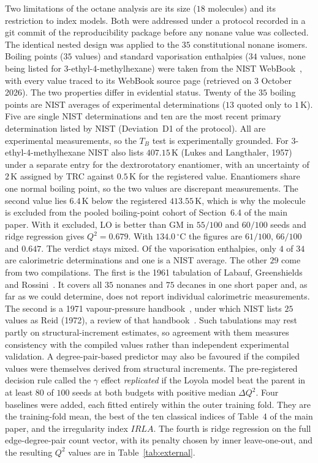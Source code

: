 \documentclass[a5paper, 10pt]{article}
\theoremstyle{plain}
\theoremstyle{remark}
\theoremstyle{definition}
\begin{document}
Two limitations of the octane analysis are its size ($18$ molecules) and
its restriction to index models. Both were addressed under a protocol
recorded in a git commit of the reproducibility package before any
nonane value was collected. The identical nested design was applied to
the $35$ constitutional nonane isomers. Boiling points ($35$ values) and
standard vaporisation enthalpies ($34$ values, none being listed for
3-ethyl-4-methylhexane) were taken from the NIST
WebBook~\cite{NISTWebBook}, with every value traced to its WebBook
source page (retrieved on 3 October 2026). The two properties differ in evidential status. Twenty of
the $35$ boiling points are NIST averages of experimental
determinations ($13$ quoted only to $1$\,K). Five are single NIST
determinations and ten are the most recent primary determination listed
by NIST (Deviation~D1 of the protocol). All are experimental
measurements, so the $T_B$ test is experimentally grounded. For
3-ethyl-4-methylhexane NIST also lists $407.15$\,K (Lukes and Langthaler, 1957) under a separate entry for the dextrorotatory enantiomer, with an uncertainty of $2$\,K assigned by TRC against $0.5$\,K for the registered value. Enantiomers share one normal boiling point, so the two values are discrepant measurements. The second value lies $6.4$\,K below the
registered $413.55$\,K, which is why the molecule is excluded from the
pooled boiling-point cohort of Section~6.4 of the main paper. With it
excluded, LO is better than GM in $55/100$ and $60/100$ seeds and ridge
regression gives $Q^2 = 0.679$. With $134.0\,^{\circ}$C the figures are
$61/100$, $66/100$ and $0.647$. The verdict stays mixed.
Of the vaporisation enthalpies, only $4$ of $34$ are calorimetric
determinations and one is a NIST average. The other $29$ come from two
compilations. The first is the 1961 tabulation of
Labauf, Greenshields and Rossini~\cite{LabaufGreenshieldsRossini1961}.
It covers all $35$ nonanes and $75$ decanes in one short paper and, as far as we could determine, does not report individual calorimetric measurements. The second is a 1971 vapour-pressure handbook~\cite{WilhoitZwolinski1971}, under which NIST lists $25$ values as Reid (1972), a review of that handbook~\cite{Reid1972}. Such tabulations may rest
partly on structural-increment estimates, so agreement with them
measures consistency with the compiled values rather than independent
experimental validation. A degree-pair-based predictor may also be
favoured if the compiled values were themselves derived from structural
increments. The pre-registered
decision rule called the $\gamma$ effect \emph{replicated} if the Loyola
model beat the parent in at least $80$ of $100$ seeds at both budgets
with positive median $\Delta Q^2$. Four baselines were added, each
fitted entirely within the outer training fold. They are the
training-fold mean, the best of the ten classical indices of Table~4 of the main paper, and the irregularity index $IRLA$. The fourth is ridge
regression on the full edge-degree-pair count vector, with its penalty
chosen by inner leave-one-out, and the resulting $Q^2$ values are in
Table~\ref{tab:external}.
\end{document}

